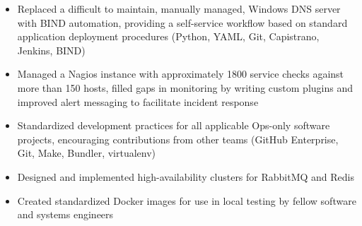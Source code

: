 \documentclass[11pt,letterpaper]{article}
\begin{document}
{\begin{small}
\begin{itemize}
      automated deployments, Nagios management and alerting, orchestration of
      routine system upgrades and much more (Coffeescript, NodeJS, Ansible)
\item Replaced a difficult to maintain, manually managed, Windows DNS server
      with BIND automation, providing a self-service workflow based on
      standard application deployment procedures (Python, YAML, Git,
      Capistrano, Jenkins, BIND)
\item Managed a Nagios instance with approximately 1800 service checks against
      more than 150 hosts, filled gaps in monitoring by writing custom plugins
      and improved alert messaging to facilitate incident response
\item Standardized development practices for all applicable Ops-only software
      projects, encouraging contributions from other teams (GitHub Enterprise,
      Git, Make, Bundler, virtualenv)
\item Designed and implemented high-availability clusters for RabbitMQ
      and Redis
\item Created standardized Docker images for use in local testing by fellow
      software and systems engineers
\end{itemize}
\end{small}
}
\end{document}
